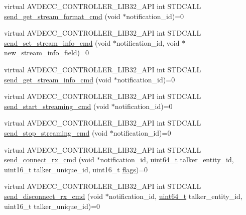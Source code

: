 \begin{DoxyCompactItemize}
\item 
virtual A\+V\+D\+E\+C\+C\+\_\+\+C\+O\+N\+T\+R\+O\+L\+L\+E\+R\+\_\+\+L\+I\+B32\+\_\+\+A\+PI int S\+T\+D\+C\+A\+LL \hyperlink{classavdecc__lib_1_1stream__input__descriptor_a4ba58b32ff7b9f5d961a0a5eb46d4c6c}{send\+\_\+get\+\_\+stream\+\_\+format\+\_\+cmd} (void $\ast$notification\+\_\+id)=0
\item 
virtual A\+V\+D\+E\+C\+C\+\_\+\+C\+O\+N\+T\+R\+O\+L\+L\+E\+R\+\_\+\+L\+I\+B32\+\_\+\+A\+PI int S\+T\+D\+C\+A\+LL \hyperlink{classavdecc__lib_1_1stream__input__descriptor_ac874693acb23b321a27df79dece5cbfb}{send\+\_\+set\+\_\+stream\+\_\+info\+\_\+cmd} (void $\ast$notification\+\_\+id, void $\ast$new\+\_\+stream\+\_\+info\+\_\+field)=0
\item 
virtual A\+V\+D\+E\+C\+C\+\_\+\+C\+O\+N\+T\+R\+O\+L\+L\+E\+R\+\_\+\+L\+I\+B32\+\_\+\+A\+PI int S\+T\+D\+C\+A\+LL \hyperlink{classavdecc__lib_1_1stream__input__descriptor_af1004affeb5ff3cf8bb9356ebcaa3aae}{send\+\_\+get\+\_\+stream\+\_\+info\+\_\+cmd} (void $\ast$notification\+\_\+id)=0
\item 
virtual A\+V\+D\+E\+C\+C\+\_\+\+C\+O\+N\+T\+R\+O\+L\+L\+E\+R\+\_\+\+L\+I\+B32\+\_\+\+A\+PI int S\+T\+D\+C\+A\+LL \hyperlink{classavdecc__lib_1_1stream__input__descriptor_a9b919107737ba0b3d86c2c316cf3a765}{send\+\_\+start\+\_\+streaming\+\_\+cmd} (void $\ast$notification\+\_\+id)=0
\item 
virtual A\+V\+D\+E\+C\+C\+\_\+\+C\+O\+N\+T\+R\+O\+L\+L\+E\+R\+\_\+\+L\+I\+B32\+\_\+\+A\+PI int S\+T\+D\+C\+A\+LL \hyperlink{classavdecc__lib_1_1stream__input__descriptor_a3a5df38802b65e88b6adb330361e4fdf}{send\+\_\+stop\+\_\+streaming\+\_\+cmd} (void $\ast$notification\+\_\+id)=0
\item 
virtual A\+V\+D\+E\+C\+C\+\_\+\+C\+O\+N\+T\+R\+O\+L\+L\+E\+R\+\_\+\+L\+I\+B32\+\_\+\+A\+PI int S\+T\+D\+C\+A\+LL \hyperlink{classavdecc__lib_1_1stream__input__descriptor_ac2512dd4aa0d7f0d917b61352294460f}{send\+\_\+connect\+\_\+rx\+\_\+cmd} (void $\ast$notification\+\_\+id, \hyperlink{parse_8c_aec6fcb673ff035718c238c8c9d544c47}{uint64\+\_\+t} talker\+\_\+entity\+\_\+id, uint16\+\_\+t talker\+\_\+unique\+\_\+id, uint16\+\_\+t \hyperlink{namespaceavdecc__lib_ab6b306ef981f5e21bb41ea2c2dbe8cd9}{flags})=0
\item 
virtual A\+V\+D\+E\+C\+C\+\_\+\+C\+O\+N\+T\+R\+O\+L\+L\+E\+R\+\_\+\+L\+I\+B32\+\_\+\+A\+PI int S\+T\+D\+C\+A\+LL \hyperlink{classavdecc__lib_1_1stream__input__descriptor_a9cb09f626eaf3616a4260825c7f30f44}{send\+\_\+disconnect\+\_\+rx\+\_\+cmd} (void $\ast$notification\+\_\+id, \hyperlink{parse_8c_aec6fcb673ff035718c238c8c9d544c47}{uint64\+\_\+t} talker\+\_\+entity\+\_\+id, uint16\+\_\+t talker\+\_\+unique\+\_\+id)=0

\end{DoxyCompactItemize}
